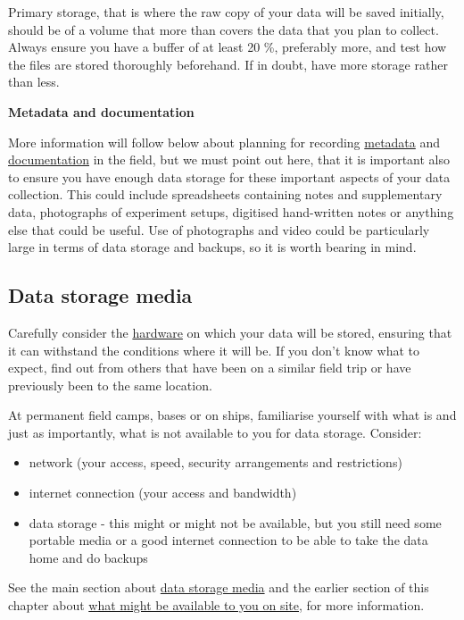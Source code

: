 \documentclass[12pt,a4paper,oneside]{report}
\providecommand{\tightlist}{%
  \setlength{\itemsep}{0pt}\setlength{\parskip}{0pt}}
\begin{document}
Primary storage, that is where the raw copy of your data will be saved
initially, should be of a volume that more than covers the data that you
plan to collect. Always ensure you have a buffer of at least 20 \%,
preferably more, and test how the files are stored thoroughly
beforehand. If in doubt, have more storage rather than less.

\textbf{Metadata and documentation}

More information will follow below about planning for recording
\protect\hyperlink{metadata}{metadata} and
\protect\hyperlink{documentation}{documentation} in the field, but we
must point out here, that it is important also to ensure you have enough
data storage for these important aspects of your data collection. This
could include spreadsheets containing notes and supplementary data,
photographs of experiment setups, digitised hand-written notes or
anything else that could be useful. Use of photographs and video could
be particularly large in terms of data storage and backups, so it is
worth bearing in mind.

\hypertarget{data-storage-media}{%
\subsection{Data storage media}\label{data-storage-media}}

Carefully consider the \protect\hyperlink{storing-data}{hardware} on
which your data will be stored, ensuring that it can withstand the
conditions where it will be. If you don't know what to expect, find out
from others that have been on a similar field trip or have previously
been to the same location.

At permanent field camps, bases or on ships, familiarise yourself with
what is and just as importantly, what is not available to you for data
storage. Consider:

\begin{itemize}
\tightlist
\item
  network (your access, speed, security arrangements and restrictions)
\item
  internet connection (your access and bandwidth)
\item
  data storage - this might or might not be available, but you still
  need some portable media or a good internet connection to be able to
  take the data home and do backups
\end{itemize}

See the main section about \protect\hyperlink{storing-data}{data storage
media} and the earlier section of this chapter about
\protect\hyperlink{on-site}{what might be available to you on site}, for
more information.
\end{document}
